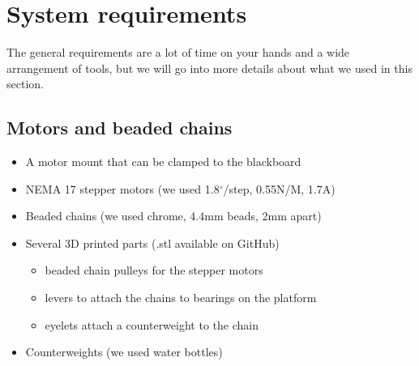 \documentclass[12pt]{article}
\begin{document}
\clearpage
\appendix

\section{System requirements}
\label{sec:sysreq}
The general requirements are a lot of time on your hands and a wide
arrangement of tools, but we will go into more details about what
we used in this section.

\subsection*{Motors and beaded chains}
\begin{itemize}
  \item A motor mount that can be clamped to the blackboard
  \item NEMA 17 stepper motors (we used 1.8$^\circ$/step, 0.55N/M, 1.7A)
  \item Beaded chains (we used chrome, 4.4mm beads, 2mm apart)
  \item Several 3D printed parts (.stl available on GitHub)
  \begin{itemize}
    \item beaded chain pulleys for the stepper motors
    \item levers to attach the chains to bearings on the platform
    \item eyelets attach a counterweight to the chain
  \end{itemize}
  \item Counterweights (we used water bottles)
\end{itemize}
\end{document}

